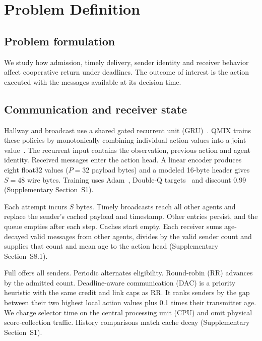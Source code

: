 \documentclass[pdflatex,sn-mathphys-num]{sn-jnl}
\begin{document}
\section{Problem Definition}\label{sec:problem}
\subsection{Problem formulation}
We study how admission, timely delivery, sender identity and receiver behavior affect cooperative return under deadlines. The outcome of interest is the action executed with the messages available at its decision time.

\subsection{Communication and receiver state}
Hallway and broadcast use a shared gated recurrent unit (GRU)~\citep{cho2014learning}. QMIX trains these policies by monotonically combining individual action values into a joint value~\citep{rashid2018qmix}. The recurrent input contains the observation, previous action and agent identity. Received messages enter the action head. A linear encoder produces eight float32 values ($P=32$ payload bytes) and a modeled 16-byte header gives $S=48$ wire bytes. Training uses Adam~\citep{kingma2015adam}, Double-Q targets~\citep{hasselt2016deepdouble} and discount 0.99 (Supplementary Section~S1).

Each attempt incurs $S$ bytes. Timely broadcasts reach all other agents and replace the sender's cached payload and timestamp. Other entries persist, and the queue empties after each step. Caches start empty. Each receiver sums age-decayed valid messages from other agents, divides by the valid sender count and supplies that count and mean age to the action head (Supplementary Section~S8.1).

Full offers all senders. Periodic alternates eligibility. Round-robin (RR) advances by the admitted count. Deadline-aware communication (DAC) is a priority heuristic with the same credit and link caps as RR. It ranks senders by the gap between their two highest local action values plus 0.1 times their transmitter age. We charge selector time on the central processing unit (CPU) and omit physical score-collection traffic. History comparisons match cache decay (Supplementary Section~S1).
\end{document}
